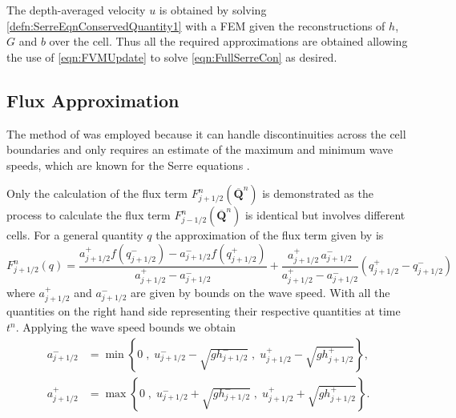 \documentclass[times]{elsarticle}
\newcommand{\vecn}[1]{\boldsymbol{#1}}
\begin{document}
The depth-averaged velocity $u$ is obtained by solving \eqref{defn:SerreEqnConservedQuantity1} with a FEM given the reconstructions of $h$, $G$ and $b$ over the cell. Thus all the required approximations are obtained allowing the use of \eqref{eqn:FVMUpdate} to solve \eqref{eqn:FullSerreCon} as desired.

\subsection{Flux Approximation}
The method of \citet{Kurganov-etal-2001-707} was employed because it can handle discontinuities across the cell boundaries and only requires an estimate of the maximum and minimum wave speeds, which are known for the Serre equations \cite{Zoppou-etal-2017}.

Only the calculation of the flux term $F^n_{j+1/2}\left(\overline{\vecn{Q} }^{n} \right)$ is demonstrated as the process to calculate the flux term $F^n_{j-1/2}\left(\overline{\vecn{Q} }^{n} \right)$ is identical but involves different cells. For a general quantity $q$ the approximation of the flux term given by \citet{Kurganov-etal-2001-707} is
\begin{equation}\label{eqn:HLL_flux}
F^n_{j+1/2}(q) = \dfrac{a^+_{j+1/2} f\left(q^-_{j+1/2}\right) - a^-_{j+1/2} f\left(q^+_{j+1/2}\right)}{a^+_{j+1/2} - a^-_{j+1/2}}  + \dfrac{a^+_{j+1/2} \, a^-_{j+1/2}}{a^+_{j+1/2} - a^-_{j+1/2}} \left(  q^+_{j+1/2} - q^-_{j+1/2} \right)
\end{equation}
where $a^+_{j+1/2}$ and $a^-_{j+1/2}$ are given by bounds on the wave speed. With all the quantities on the right hand side representing their respective quantities at time $t^n$. Applying the wave speed bounds \cite{Zoppou-etal-2017} we obtain
\begin{subequations}
\begin{align}
a^-_{j+{1}/{2}} &= \min\left\lbrace 0\;,\;  u^-_{j + 1/2} - \sqrt{g  {h}^-_{j + 1/2}}  \;,\;u^+_{j + 1/2} - \sqrt{g  {h}^+_{j + 1/2}} \right\rbrace  ,\\
a^+_{j+1/2} &= \max\left\lbrace 0 \;,\;  u^-_{j + 1/2} + \sqrt{g {h}^-_{j + 1/2}}  \;,\;u^+_{j + 1/2} + \sqrt{g  {h}^+_{j + 1/2}} \right\rbrace .
\end{align}
\label{eqn:WaveSpeedBoundsFluxApprox}
\end{subequations}
\end{document}
